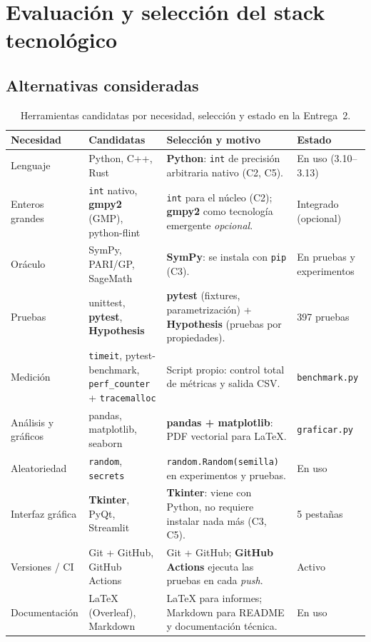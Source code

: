 \section{Evaluación y selección del stack tecnológico}
\label{sec:stack}

\subsection{Alternativas consideradas}

\begin{table}[H]
\centering\small
\caption{Herramientas candidatas por necesidad, selección y estado en la Entrega~2.}
\label{tab:herramientas}
\begin{tabularx}{\textwidth}{@{}l R{3.3cm} Y R{2.4cm}@{}}
\toprule
\textbf{Necesidad} & \textbf{Candidatas} & \textbf{Selección y motivo} & \textbf{Estado}\\
\midrule
Lenguaje & Python, C++, Rust & \textbf{Python}: \texttt{int} de precisión arbitraria nativo (C2, C5). & En uso (3.10--3.13)\\
Enteros grandes & \texttt{int} nativo, \textbf{gmpy2} (GMP), python-flint & \texttt{int} para el núcleo (C2); \textbf{gmpy2} como tecnología emergente \emph{opcional}. & Integrado (opcional)\\
Oráculo & SymPy, PARI/GP, SageMath & \textbf{SymPy}: se instala con \texttt{pip} (C3). & En pruebas y experimentos\\
Pruebas & unittest, \textbf{pytest}, \textbf{Hypothesis} & \textbf{pytest} (fixtures, parametrización) + \textbf{Hypothesis} (pruebas por propiedades). & 397 pruebas\\
Medición & \texttt{timeit}, pytest-benchmark, \texttt{perf\_counter} + \texttt{tracemalloc} & Script propio: control total de métricas y salida CSV. & \texttt{benchmark.py}\\
Análisis y gráficos & pandas, matplotlib, seaborn & \textbf{pandas + matplotlib}: PDF vectorial para LaTeX. & \texttt{graficar.py}\\
Aleatoriedad & \texttt{random}, \texttt{secrets} & \texttt{random.Random(semilla)} en experimentos y pruebas. & En uso\\
Interfaz gráfica & \textbf{Tkinter}, PyQt, Streamlit & \textbf{Tkinter}: viene con Python, no requiere instalar nada más (C3, C5). & 5 pestañas\\
Versiones / CI & Git + GitHub, GitHub Actions & Git + GitHub; \textbf{GitHub Actions} ejecuta las pruebas en cada \emph{push}. & Activo\\
Documentación & LaTeX (Overleaf), Markdown & LaTeX para informes; Markdown para README y documentación técnica. & En uso\\
\bottomrule
\end{tabularx}
\end{table}

